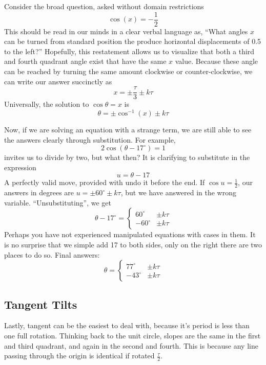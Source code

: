 Consider the broad question, asked without domain restrictions
\begin{equation}
\cos(x) = -\frac{1}{2}
\end{equation}
This should be read in our minds in a clear verbal language as, ``What angles $x$ can be
turned from standard position the produce horizontal displacements of 0.5 to the left?''
Hopefully, this restatement allows us to visualize that both a third and fourth
quadrant angle exist that have the same $x$ value.  Because these angle can be reached by
turning the same amount clockwise or counter-clockwise, we can write our answer
succinctly as 
$$
x= \pm\frac{\tau}{3} \pm k\tau
$$
Universally, the solution to $\cos\theta = x$ is
\begin{equation}
\theta = \pm\cos^{-1}(x) \pm k\tau
\end{equation}

Now, if we are solving an equation with a strange term, we are still able to see the
answers clearly through substitution.  For example, 
$$
2 \cos (\theta - 17^\circ) = 1
$$
invites us to divide by two, but what then?  It is clarifying to substitute in the expression
\begin{equation}
u = \theta - 17
\end{equation}
A perfectly valid move, provided with undo it before the end.  If $\cos u = \frac{1}{2}$, our
answers in degrees are $u = \pm60^\circ \pm k\tau$, but we have answered in the wrong
variable.  ``Unsubstituting'', we get
\begin{equation}
\theta - 17^\circ = \begin{cases} 60^\circ & \pm k\tau \\ -60^\circ & \pm k\tau \end{cases}
\end{equation}
Perhaps you have not experienced manipulated equations with cases in them.  It is no
surprise that we simple add 17 to both sides, only on the right there are two places to do so.
Final answers:
$$
\theta = \begin{cases} 77^\circ & \pm k\tau \\ -43^\circ & \pm k\tau \end{cases}
$$

\subsection{Tangent Tilts}
Lastly, tangent can be the easiest to deal with, because it's period is less than one
full rotation.  Thinking back to the unit circle, slopes are the same in the first and third
quadrant, and again in the second and fourth.  This is because any line passing through
the origin is identical if rotated $\frac{\tau}{2}$.  

